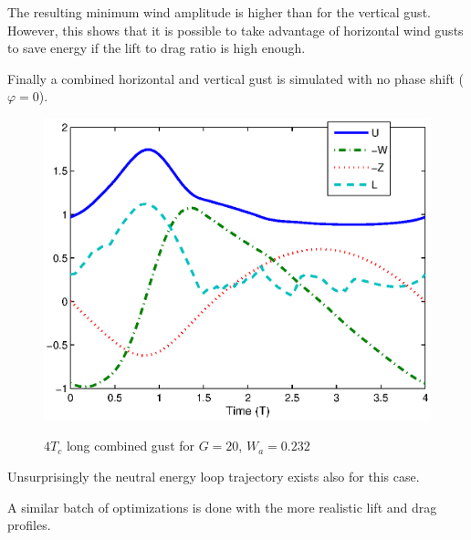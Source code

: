 \FloatBarrier

The resulting minimum wind amplitude is higher than for the vertical gust. 
However, this shows that it is possible to take advantage of horizontal wind gusts to save energy if the lift to drag ratio is high enough.

\par Finally a combined horizontal and vertical gust is simulated with no phase shift ($\varphi=0$).

\begin{figure}[h]
  \begin{center}
    \scalebox{1.0}
    {\includegraphics{./Figures/Windtype=3_Tg=4_Wg=0p232_quad_G=20.eps}}
  \end{center}
  \caption{$4T_c$ long combined gust for $G=20$, $W_a=0.232$}
  \label{fig:combined_optimization}
\end{figure}

\FloatBarrier
Unsurprisingly the neutral energy loop trajectory exists also for this case.



\par A similar batch of optimizations is done with the more realistic lift and drag profiles.

